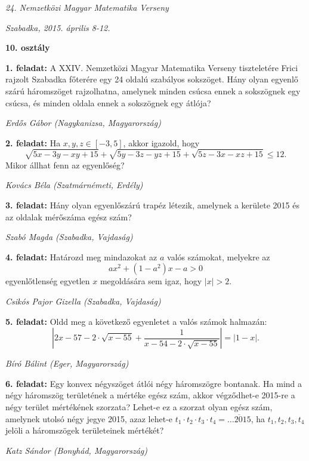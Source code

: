 \documentclass[a4paper,10pt]{article}
\newcommand{\ki}[2]{\hfill {\it #1 (#2)}\medskip}
\begin{document}
\begin{center} \Large {\em 24. Nemzetközi Magyar Matematika Verseny} \end{center}
\begin{center} \large{\em Szabadka, 2015. április 8-12.} \end{center}
\smallskip
\begin{center} \large{\bf 10. osztály} \end{center}
\bigskip 

{\bf 1. feladat: } A XXIV. Nemzetközi Magyar Matematika Verseny tiszteletére Frici rajzolt Szabadka főterére egy 24 oldalú szabályos sokszöget. Hány olyan egyenlő szárú háromszöget rajzolhatna, amelynek minden csúcsa ennek a sokszögnek egy csúcsa, és minden oldala ennek a sokszögnek egy átlója?

\ki{Erdős Gábor}{Nagykanizsa, Magyarország}\medskip

{\bf 2. feladat: } Ha $x,y,z\in[-3, 5]$, akkor igazold, hogy
$$\sqrt{5x-3y-xy+15}+
\sqrt{5y-3z-yz+15}+\sqrt{5z-3x-xz+15}\le 12.$$
Mikor állhat fenn az egyenlőség?

\ki{Kovács Béla}{Szatmárnémeti, Erdély}\medskip

{\bf 3. feladat: } Hány olyan egyenlőszárú trapéz létezik, amelynek a kerülete 2015 és az oldalak mérőszáma egész szám?

\ki{Szabó Magda}{Szabadka, Vajdaság}\medskip

{\bf 4. feladat: } Határozd meg mindazokat az $a$ valós számokat, melyekre az 
$$ax^2+(1-a^2)x-a>0$$
egyenlőtlenség egyetlen $x$ megoldására sem igaz, hogy $|x|>2$.

\ki{Csikós Pajor Gizella}{Szabadka, Vajdaság}\medskip

{\bf 5. feladat: } Oldd meg a következő egyenletet a valós számok halmazán:
$$\left|2x-57-2\cdot\sqrt{x-55}+\frac{1}{x-54-2\cdot\sqrt{x-55}}\right|=|1-x|.$$

\ki{Bíró Bálint}{Eger, Magyarország}\medskip

{\bf 6. feladat: } Egy konvex négyszöget átlói négy háromszögre bontanak. Ha mind a négy háromszög területének a mértéke egész szám, akkor végződhet-e 2015-re a négy terület mértékének szorzata? Lehet-e ez a szorzat olyan egész szám, amelynek utolsó négy jegye 2015, azaz lehet-e 
$t_1\cdot t_2\cdot t_3 \cdot t_4 = \overline{\ldots2015}$, ha $t_1, t_2, t_3, t_4$ jelöli a háromszögek területeinek mértékét?

\ki{Katz Sándor}{Bonyhád, Magyarország}\medskip
\end{document}
